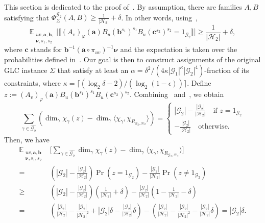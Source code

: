 \documentclass[a4paper,11pt]{article}
\theoremstyle{definition}
\newcommand{\tuple}[1]{{\mathbf{#1}}}
\newcommand{\ex}[1]{\mathbb{E}_{#1}}
\newcommand{\gr}{\mathscr{G}}
\newcommand{\sgr}{\mathscr{H}}
\newcommand{\ba}{\mathbf{a}}
\newcommand{\bb}{\mathbf{b}}
\newcommand{\bc}{\mathbf{c}}
\newcommand{\groupid}{1}
\begin{document}
This section is dedicated to the proof of~. By assumption, there are families $A, B$
satisfying that
$\Phi_\Sigma^{\gr_2}(A,B)  \geq \frac{1}{|\sgr_2|} + \delta$. In other words, using~,
\[
\ex{\substack{uv, \tuple{a},\tuple{b}, \\ \bm{\nu},s_1,s_2}} \Big[ 
\llbracket (A_v)_{\varphi}(\tuple{a}) B_u(\tuple{b}^{s_1})^{s_1} B_u(\tuple{c}^{s_2})^{s_2}    = \groupid_{\gr_2} \rrbracket 
\Big]  \geq \frac{1}{|\sgr_2|} + \delta,
\]
where $\tuple{c}$ stands for
$\tuple{b}^{-1} (\tuple{a} \circ \pi_{uv})^{-1}\bm{\nu}$ and the expectation is taken over the probabilities defined in~.
Our goal is then to construct assignments of the original GLC instance $\Sigma$ that satisfy at least an $\alpha=\delta^2/(4\kappa|\gr_1|^\kappa|\gr_2|^{4})$-fraction of its constraints, where $\kappa=\lceil(\log_2\delta -2)/(\log_2(1-\epsilon))\rceil$.
Define $z:= (A_v)_{\varphi}(\ba)B_u(\bb^{s_1})^{s_1}B_u(\bc^{s_2})^{s_2}$.  Combining~ and~, we obtain 
\[ \sum_{\gamma \in \widehat{\gr_2}} \left(\dim_\gamma \chi_{\gamma}(z) - \dim_\gamma \langle \chi_\gamma, \chi_{R_{\gr_2,\sgr_2}} \rangle \right) =\begin{cases}
    |\gr_2| - \frac{|\gr_2|}{|\sgr_2|}  \quad \text{if } z=\groupid_{\gr_2}\\
    - \frac{|\gr_2|}{|\sgr_2|} \quad \text{otherwise.}
\end{cases}\]
Then, we have 
\begin{align*}
 \ex{\substack{uv, \tuple{a},\tuple{b}\\ \bm{\nu},s_1,s_2}}   &
\Big[ 
\sum_{\gamma \in \widehat{\gr_2}} \dim_\gamma \chi_{\gamma}(z) - 
\dim_\gamma \langle \chi_\gamma, \chi_{R_{\gr_2,\sgr_2}} \rangle \Big] \\ = &
\left(|\gr_2| - \frac{|\gr_2|}{|\sgr_2|}\right)
\Pr\left( z = 1_{\gr_2}\right)
- \frac{|\gr_2|}{|\sgr_2|} 
\Pr\left( z \neq 1_{\gr_2}\right)  \\  \geq &
\left(|\gr_2| - \frac{|\gr_2|}{|\sgr_2|}\right) \left( \frac{1}{|\sgr_2|} +\delta \right)
- \frac{|\gr_2|}{|\sgr_2|} 
\left( 1 -  \frac{1}{|\sgr_2|} -\delta \right) \\  = &
\left(
\frac{|\gr_2|}{|\sgr_2|} -
\frac{|\gr_2|}{|\sgr_2|^2} +
|\gr_2|\delta -
\frac{|\gr_2|}{|\sgr_2|} \delta
\right)
-
\left(
\frac{|\gr_2|}{|\sgr_2|} -
\frac{|\gr_2|}{|\sgr_2|^2} -
\frac{|\gr_2|}{|\sgr_2|} \delta
\right) =  
|\gr_2|\delta.
\end{align*}
\end{document}
